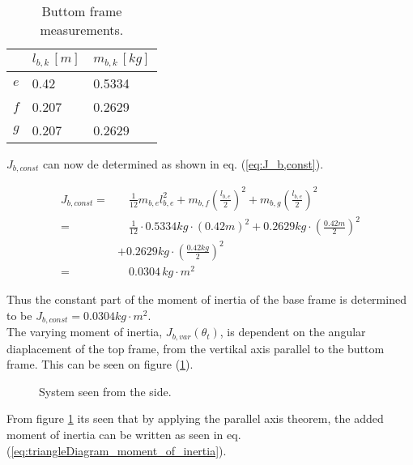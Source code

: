 \documentclass[../../main]{subfiles}
\begin{document}
\begin{table}[H]
\centering
\begin{tabular}{|l|l|l|}
\hline
  & $l_{b,k} \, \si{[m]}$ & $m_{b,k} \, \si{[kg]}$ \\
\hline
$e$ & 0.42  & 0.5334  \\
\hline
$f$ & 0.207  & 0.2629  \\
\hline
$g$ & 0.207 & 0.2629  \\
\hline
\end{tabular}
\caption{Buttom frame measurements.}
    \label{tab:Base_frame_table}
\end{table}

$J_{b,const}$ can now de determined as shown in eq. (\ref{eq:J_b,const}).

\begin{equation}
  \label{eq:J_b,const}
  \begin{split}
      J_{b,const} =& \quad \frac{1}{12}m_{b,e}l_{b,e}^2 + m_{b,f} \left( \frac{l_{b,e}}{2} \right)^2 + m_{b,g}\left(\frac{l_{b,e}}{2}\right)^2\\
      =& \quad \frac{1}{12} \cdot 0.5334\si{kg} \cdot (0.42 \si{m})^2 + 0.2629\si{kg} \cdot \left( \frac{0.42 \si{m}}{2} \right)^2 \\
      &+ 0.2629 \si{kg}\cdot \left(\frac{0.42 \si{kg}}{2}\right)^2\\
      =& \quad 0.0304 \si{\,kg\cdot m^2}
  \end{split}
\end{equation}

Thus the constant part of the moment of inertia of the base frame is determined to be $J_{b,const} = 0.0304 \si{kg\cdot m^2}$.\\

The varying moment of inertia, $J_{b,var}(\theta_t)$, is dependent on the angular diaplacement of the top frame, from the vertikal axis parallel to the buttom frame. This can be seen on figure (\ref{fig:TrekantDiagram}).

\begin{figure}[H]
  \centering
  \def\svgwidth{0.4\columnwidth}
  
  \caption{System seen from the side.}
  \label{fig:TrekantDiagram}
\end{figure}

From figure \ref{fig:TrekantDiagram} its seen that by applying the parallel axis theorem, the added moment of inertia can be written as seen in eq. (\ref{eq:triangleDiagram_moment_of_inertia}).
\end{document}
